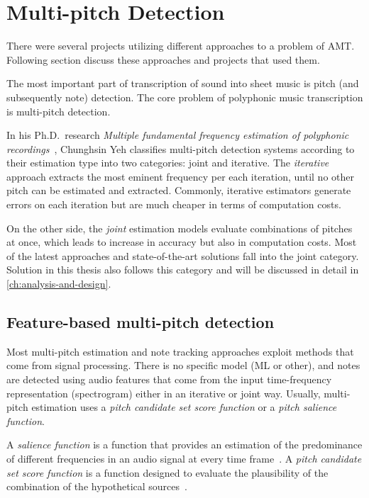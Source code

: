 \section{Multi-pitch Detection}\label{sec:multi-pitch-detection}
There were several projects utilizing different approaches to a problem of \ac{AMT}. Following section discuss these
approaches and projects that used them.

The most important part of transcription of sound into sheet music is pitch (and subsequently note) detection. The core
problem of polyphonic music transcription is multi-pitch detection.

In his Ph.D.\ research \textit{Multiple fundamental frequency estimation of polyphonic recordings}~\cite{fundamental-frequency-estimation},
Chunghsin Yeh classifies multi-pitch detection systems according to their estimation type into two categories: joint and
iterative. The \textit{iterative} approach extracts the most eminent frequency per each iteration, until no other pitch
can be estimated and extracted. Commonly, iterative estimators generate errors on each iteration but are much cheaper in
terms of computation costs.

On the other side, the \textit{joint} estimation models evaluate combinations of pitches at once, which leads to
increase in accuracy but also in computation costs. Most of the latest approaches and state-of-the-art solutions fall
into the joint category. Solution in this thesis also follows this category and will be discussed in detail in \cref{ch:analysis-and-design}.

\subsection{Feature-based multi-pitch detection}\label{subsec:feature-based-multi-pitch-detection}
Most multi-pitch estimation and note tracking approaches exploit methods that come from signal processing. There is no
specific model (\ac{ML} or other), and notes are detected using audio features that come from the input time-frequency
representation (spectrogram) either in an iterative or joint way. Usually, multi-pitch estimation uses a \textit{pitch
candidate set score function} or a \textit{pitch salience function}.

A \textit{salience function} is a function that provides an estimation of the predominance of different frequencies in
an audio signal at every time frame~\cite{pitch-salience-function}. A \textit{pitch candidate set score function} is
a function designed to evaluate the plausibility of the combination of the hypothetical sources~\cite{fundamental-frequency-estimation}.

